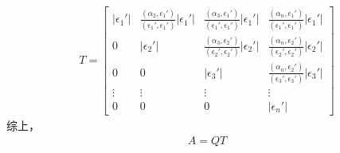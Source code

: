 \documentclass{article}
\begin{document}
\begin{align*}
  T = \begin{bmatrix}
        |\epsilon_1'| & \frac{(\alpha_2, \epsilon_1')}{(\epsilon_1', \epsilon_1')} |\epsilon_1'| & \frac{(\alpha_3, \epsilon_1')}{(\epsilon_1', \epsilon_1')} |\epsilon_1'| & \frac{(\alpha_n, \epsilon_1')}{(\epsilon_1', \epsilon_1')} |\epsilon_1'| \\
        0             & |\epsilon_2'|                                                            & \frac{(\alpha_3, \epsilon_2')}{(\epsilon_2', \epsilon_2')} |\epsilon_2'| & \frac{(\alpha_n, \epsilon_2')}{(\epsilon_2', \epsilon_2')} |\epsilon_2'| \\
        0             & 0                                                                        & |\epsilon_3'|                                                            & \frac{(\alpha_n, \epsilon_2')}{(\epsilon_3', \epsilon_3')} |\epsilon_3'| \\
        \vdots        & \vdots                                                                   & \vdots                                                                   & \vdots                                                                   \\
        0             & 0                                                                        & 0                                                                        & |\epsilon_n'|
      \end{bmatrix}
\end{align*}
综上，
\begin{align*}
  A = Q T
\end{align*}
\end{document}
